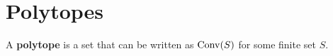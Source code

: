 \section{Polytopes}

\begin{definition}[Polytope]
    \label{1-2-2-polytope}
    \leanok
  
    A {\bf polytope} is a set that can be written as $\operatorname{Conv}(S)$ for some finite set $S$.
  \end{definition}
